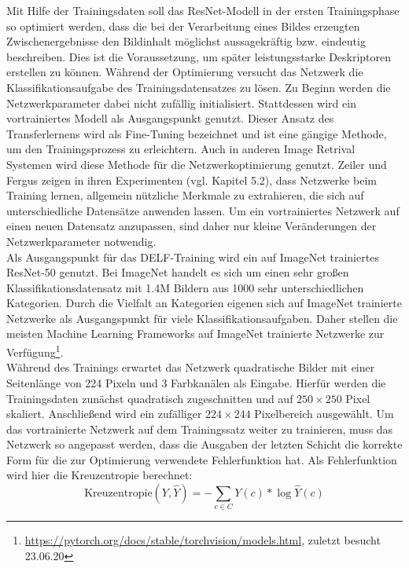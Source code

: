 Mit Hilfe der Trainingsdaten soll das ResNet-Modell in der ersten Trainingsphase so optimiert werden, dass die bei der Verarbeitung eines Bildes erzeugten Zwischenergebnisse den Bildinhalt möglichst aussagekräftig bzw. eindeutig beschreiben. Dies ist die Voraussetzung, um später leistungsstarke Deskriptoren erstellen zu können. Während der Optimierung versucht das Netzwerk die Klassifikationsaufgabe des Trainingsdatensatzes zu lösen. Zu Beginn werden die Netzwerkparameter dabei nicht zufällig initialisiert. Stattdessen wird ein vortrainiertes Modell als Ausgangspunkt genutzt. Dieser Ansatz des Transferlernens wird als Fine-Tuning bezeichnet und ist eine gängige Methode, um den Trainingsprozess zu erleichtern. Auch in anderen Image Retrival Systemen \cite{convnet} \cite{siamac_contrastive_loss} wird diese Methode für die Netzwerkoptimierung genutzt. Zeiler und Fergus zeigen in ihren Experimenten (vgl. \cite{extraction_point_meaning} Kapitel 5.2), dass Netzwerke beim Training lernen, allgemein nützliche Merkmale zu extrahieren, die sich auf unterschiedliche Datensätze anwenden lassen. Um ein vortrainiertes Netzwerk auf einen neuen Datensatz anzupassen, sind daher nur kleine Veränderungen der Netzwerkparameter notwendig.
\\
Als Ausgangspunkt für das DELF-Training wird ein auf ImageNet trainiertes ResNet-50 genutzt. Bei ImageNet handelt es sich um einen sehr großen Klassifikationsdatensatz mit 1.4M Bildern aus 1000 sehr unterschiedlichen Kategorien. Durch die Vielfalt an Kategorien eigenen sich auf ImageNet trainierte Netzwerke als Ausgangspunkt für viele Klassifikationsaufgaben. Daher stellen die meisten Machine Learning Frameworks auf ImageNet trainierte Netzwerke zur Verfügung\footnote{\url{https://pytorch.org/docs/stable/torchvision/models.html}, zuletzt besucht 23.06.20}. 
\\
Während des Trainings erwartet das Netzwerk quadratische Bilder mit einer Seitenlänge von 224 Pixeln und 3 Farbkanälen als Eingabe. Hierfür werden die Trainingsdaten zunächst quadratisch zugeschnitten und auf $250\times250$ Pixel skaliert. Anschließend wird ein zufälliger $224\times244$ Pixelbereich ausgewählt.
Um das vortrainierte Netzwerk auf dem Trainingssatz weiter zu trainieren, muss das Netzwerk so angepasst werden, dass die Ausgaben der letzten Schicht die korrekte Form für die zur Optimierung verwendete Fehlerfunktion hat. Als Fehlerfunktion wird hier die Kreuzentropie berechnet:
\begin{equation}
\text{Kreuzentropie}(Y,\hat{Y}) = -\sum_{c \in C}{Y(c)*\log\hat{Y}(c)}
\end{equation}
